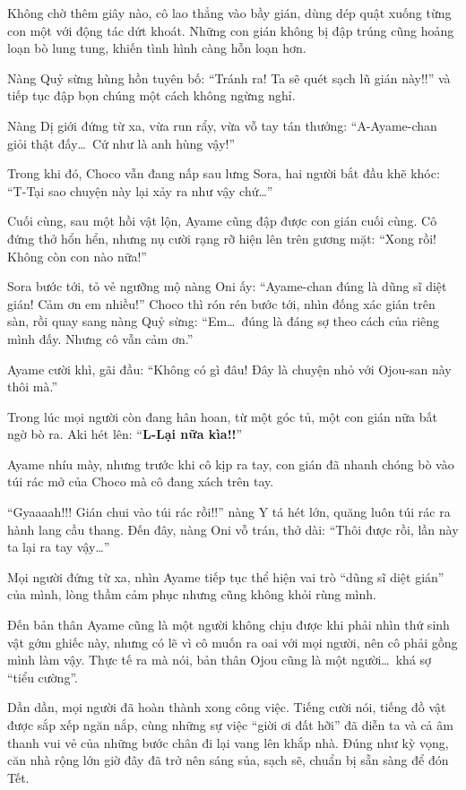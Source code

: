 \documentclass[../main.tex]{subfiles}
\begin{document}
Không chờ thêm giây nào, cô lao thẳng vào bầy gián, dùng dép quật xuống từng con một với động tác dứt khoát. Những con gián không bị đập trúng cũng hoảng loạn bò lung tung, khiến tình hình càng hỗn loạn hơn.

Nàng Quỷ sừng hùng hồn tuyên bố: ``Tránh ra! Ta sẽ quét sạch lũ gián này!!'' và tiếp tục đập bọn chúng một cách không ngừng nghỉ.

Nàng Dị giới đứng từ xa, vừa run rẩy, vừa vỗ tay tán thưởng: ``A-Ayame-chan giỏi thật đấy\dots\ Cứ như là anh hùng vậy!''

Trong khi đó, Choco vẫn đang nấp sau lưng Sora, hai người bắt đầu khẽ khóc: ``T-Tại sao chuyện này lại xảy ra như vậy chứ\dots''

Cuối cùng, sau một hồi vật lộn, Ayame cũng đập được con gián cuối cùng. Cô đứng thở hổn hển, nhưng nụ cười rạng rỡ hiện lên trên gương mặt: ``Xong rồi! Không còn con nào nữa!''

Sora bước tới, tỏ vẻ ngưỡng mộ nàng Oni ấy: ``Ayame-chan đúng là dũng sĩ diệt gián! Cảm ơn em nhiều!'' Choco thì rón rén bước tới, nhìn đống xác gián trên sàn, rồi quay sang nàng Quỷ sừng: ``Em\dots\ đúng là đáng sợ theo cách của riêng mình đấy. Nhưng cô vẫn cảm ơn.''

Ayame cười khì, gãi đầu: ``Không có gì đâu! Đây là chuyện nhỏ với Ojou-san này thôi mà.''

Trong lúc mọi người còn đang hân hoan, từ một góc tủ, một con gián nữa bất ngờ bò ra. Aki hét lên: ``\textbf{L-Lại nữa kìa!!}''

Ayame nhíu mày, nhưng trước khi cô kịp ra tay, con gián đã nhanh chóng bò vào túi rác mở của Choco mà cô đang xách trên tay.

``Gyaaaah!!! Gián chui vào túi rác rồi!!'' nàng Y tá hét lớn, quăng luôn túi rác ra hành lang cầu thang. Đến đây, nàng Oni vỗ trán, thở dài: ``Thôi được rồi, lần này ta lại ra tay vậy\dots''

Mọi người đứng từ xa, nhìn Ayame tiếp tục thể hiện vai trò ``dũng sĩ diệt gián'' của mình, lòng thầm cảm phục nhưng cũng không khỏi rùng mình.

Đến bản thân Ayame cũng là một người không chịu được khi phải nhìn thứ sinh vật gớm ghiếc này, nhưng có lẽ vì cô muốn ra oai với mọi người, nên cô phải gồng mình làm vậy. Thực tế ra mà nói, bản thân Ojou cũng là một người\dots\ khá sợ ``tiểu cường''.

\ct

Dần dần, mọi người đã hoàn thành xong công việc. Tiếng cười nói, tiếng đồ vật được sắp xếp ngăn nắp, cùng những sự việc ``giời ơi đất hỡi'' đã diễn ta và cả âm thanh vui vẻ của những bước chân đi lại vang lên khắp nhà. Đúng như kỳ vọng, căn nhà rộng lớn giờ đây đã trở nên sáng sủa, sạch sẽ, chuẩn bị sẵn sàng để đón Tết.
\end{document}
